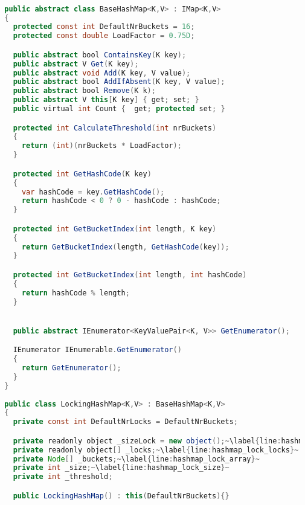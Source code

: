 \begin{lstlisting}[label=lst:impl_hashmap_lock,
  caption={Lock Based Concurrent Hashmap Implementation},
  language=Java,  
  showspaces=false,
  showtabs=false,
  breaklines=true,
  showstringspaces=false,
  breakatwhitespace=true,
  commentstyle=\color{greencomments},
  keywordstyle=\color{bluekeywords},
  stringstyle=\color{redstrings},
  escapechar=~,
  morekeywords={atomic, retry, orelse, var, get, set, ref, out, readonly, virtual, override, region, endregion, foreach, lock}]  % Start your code-block

  public abstract class BaseHashMap<K,V> : IMap<K,V>
  {
    protected const int DefaultNrBuckets = 16;
    protected const double LoadFactor = 0.75D;

    public abstract bool ContainsKey(K key);
    public abstract V Get(K key);
    public abstract void Add(K key, V value);
    public abstract bool AddIfAbsent(K key, V value);
    public abstract bool Remove(K k);
    public abstract V this[K key] { get; set; }
    public virtual int Count {  get; protected set; }

    protected int CalculateThreshold(int nrBuckets)
    {
      return (int)(nrBuckets * LoadFactor);
    }

    protected int GetHashCode(K key)
    {
      var hashCode = key.GetHashCode();
      return hashCode < 0 ? 0 - hashCode : hashCode;
    }

    protected int GetBucketIndex(int length, K key)
    {
      return GetBucketIndex(length, GetHashCode(key));
    }

    protected int GetBucketIndex(int length, int hashCode)
    {
      return hashCode % length;
    }


    public abstract IEnumerator<KeyValuePair<K, V>> GetEnumerator();

    IEnumerator IEnumerable.GetEnumerator()
    {
      return GetEnumerator();
    }
  }
  
  public class LockingHashMap<K,V> : BaseHashMap<K,V>
  {
    private const int DefaultNrLocks = DefaultNrBuckets;

    private readonly object _sizeLock = new object();~\label{line:hashmap_lock_size_lock}~
    private readonly object[] _locks;~\label{line:hashmap_lock_locks}~
    private Node[] _buckets;~\label{line:hashmap_lock_array}~
    private int _size;~\label{line:hashmap_lock_size}~
    private int _threshold;

    public LockingHashMap() : this(DefaultNrBuckets){}


\end{lstlisting}
